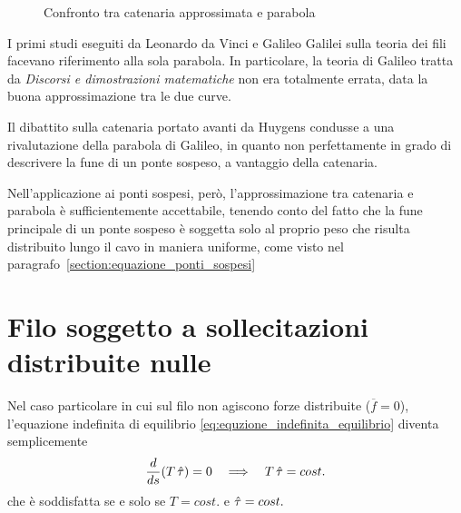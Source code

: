 \begin{figure}
  \centering
  
  \caption{Confronto tra catenaria approssimata e parabola}
  \label{fig:confronto_catenaria_parabola}
   
  
 \end{figure}
 
I primi studi eseguiti da Leonardo da Vinci e Galileo Galilei sulla teoria dei fili  facevano riferimento alla sola parabola. In particolare, la teoria di Galileo tratta da \emph{Discorsi e dimostrazioni matematiche} non era totalmente errata, data la buona approssimazione tra le due curve.

Il dibattito sulla catenaria portato avanti da Huygens condusse a una rivalutazione della parabola di Galileo, in quanto non perfettamente in grado di descrivere  la fune di un ponte sospeso, a vantaggio della catenaria.

Nell'applicazione ai ponti sospesi, però, l'approssimazione tra catenaria e parabola è sufficientemente accettabile, tenendo conto del fatto che la fune principale di un ponte sospeso è soggetta solo al proprio peso che risulta distribuito lungo il cavo in maniera uniforme, come visto nel paragrafo~\ref{section:equazione_ponti_sospesi}

\section{Filo soggetto a sollecitazioni distribuite nulle}
Nel caso particolare in cui sul filo non agiscono forze distribuite ($\overline{f}=0$), l'equazione indefinita di equilibrio \eqref{eq:equzione_indefinita_equilibrio} diventa semplicemente
\[
 \dfrac{d}{ds}(T\,\hat{\tau})= 0 \quad \Longrightarrow\quad T\,\hat{\tau} = cost.
\]
che è soddisfatta se e solo se $T=cost.$ e $\hat{\tau} = cost.$

